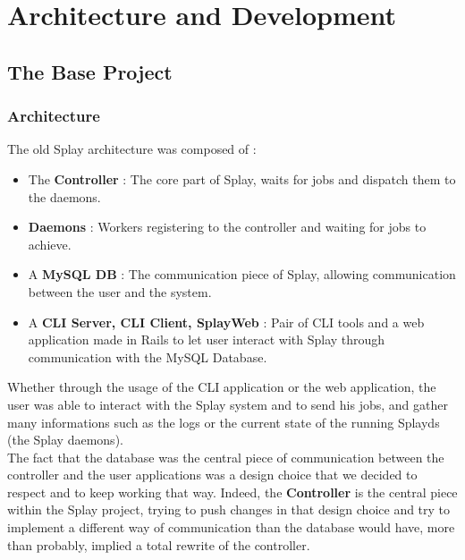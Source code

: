 \documentclass{eplmastersthesis}
\begin{document}
  \chapter{Architecture and Development}

    \section{The Base Project}

      \subsection{Architecture}

        The old Splay architecture was composed of :

        \begin{itemize}
          \item The \textbf{Controller} : The core part of Splay, waits for jobs
          and dispatch them to the daemons.
          \item \textbf{Daemons} : Workers registering to the controller and waiting
          for jobs to achieve.
          \item A \textbf{MySQL DB} : The communication piece of Splay, allowing
          communication between the user and the system.
          \item A \textbf{CLI Server, CLI Client, SplayWeb} : Pair of CLI tools
          and a web application made in Rails to let user interact with
          Splay through communication with the MySQL Database.
        \end{itemize}

        Whether through the usage of the CLI application or the web application,
        the user was able to interact with the Splay system and to send his
        jobs, and gather many informations such as the logs or the current
        state of the running Splayds (the Splay daemons).\\

        The fact that the database was the central piece of communication
        between the controller and the user applications was a design choice
        that we decided to respect and to keep working that way. Indeed, the
        \textbf{Controller} is the central piece within the Splay project,
        trying to push changes in that design choice and try to implement a
        different way of communication than the database would have, more
        than probably, implied a total rewrite of the controller.\\
\end{document}
